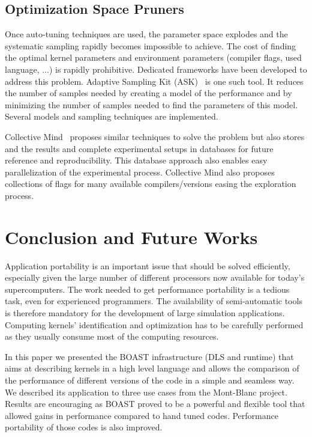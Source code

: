 \documentclass{IEEEtran}
\begin{document}
\subsection{Optimization Space Pruners}

Once auto-tuning techniques are used, the parameter space explodes and the
systematic sampling rapidly becomes impossible to achieve. The cost of finding
the optimal kernel parameters and environment parameters (compiler flags, used
language, ...) is rapidly prohibitive. Dedicated frameworks have been developed
to address this problem. Adaptive Sampling Kit (ASK)~\cite{castro2013adaptive}
is one such tool. It reduces the number of samples needed by creating a model of
the performance and by minimizing the number of samples needed to find the
parameters of this model. Several models and sampling techniques are
implemented.

Collective Mind~\cite{fursin:hal-01054763} proposes similar techniques to
solve the problem but also stores and the results and complete experimental
setups in databases for future reference and reproducibility. This database
approach also enables easy parallelization of the experimental process.
Collective Mind also proposes collections of flags for many available
compilers/versions easing the exploration process.

\section{Conclusion and Future Works}

Application portability is an important issue that should be solved efficiently, especially given the large number of different processors now
available for today's supercomputers. The work needed to get performance portability is a tedious task, even for experienced programmers. The
availability of semi-automatic tools is therefore mandatory for the development of large simulation applications. Computing kernels' identification
and optimization has to be carefully performed as they usually consume most of the computing resources. 

In this paper we presented the BOAST infrastructure (DLS and runtime) that aims at describing kernels in a high level language and allows the
comparison of the performance of different versions of the code in a simple and seamless way. We described its application to three use cases from the
Mont-Blanc project. Results are encouraging as BOAST proved to be a powerful and flexible tool that allowed gains in performance compared to hand
tuned codes. Performance portability of those codes is also improved.
\end{document}
